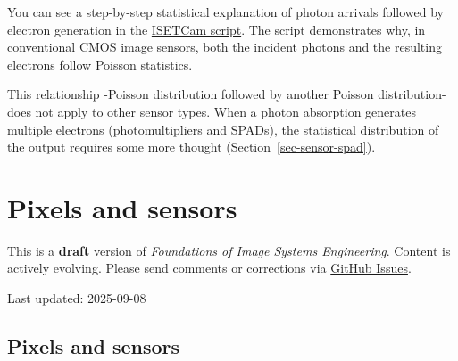 \documentclass[
  letterpaper,
]{book}
\begin{document}
\begin{tcolorbox}[enhanced jigsaw, colframe=quarto-callout-note-color-frame, titlerule=0mm, rightrule=.15mm, opacitybacktitle=0.6, colback=white, leftrule=.75mm, coltitle=black, title=\textcolor{quarto-callout-note-color}{\faInfo}\hspace{0.5em}{ISETCam: shot noise}, bottomrule=.15mm, colbacktitle=quarto-callout-note-color!10!white, breakable, left=2mm, bottomtitle=1mm, toptitle=1mm, opacityback=0, arc=.35mm, toprule=.15mm]

You can see a step-by-step statistical explanation of photon arrivals
followed by electron generation in the
\href{../code/fise_photonsElectrons.html}{ISETCam script}. The script
demonstrates why, in conventional CMOS image sensors, both the incident
photons and the resulting electrons follow Poisson statistics.

This relationship -Poisson distribution followed by another Poisson
distribution- does not apply to other sensor types. When a photon
absorption generates multiple electrons (photomultipliers and SPADs),
the statistical distribution of the output requires some more thought
(Section~\ref{sec-sensor-spad}).

\end{tcolorbox}

\chapter{Pixels and sensors}\label{sec-pixels}

\begin{tcolorbox}[enhanced jigsaw, colframe=quarto-callout-warning-color-frame, titlerule=0mm, rightrule=.15mm, opacitybacktitle=0.6, colback=white, leftrule=.75mm, coltitle=black, title=\textcolor{quarto-callout-warning-color}{\faExclamationTriangle}\hspace{0.5em}{Work in Progress}, bottomrule=.15mm, colbacktitle=quarto-callout-warning-color!10!white, breakable, left=2mm, bottomtitle=1mm, toptitle=1mm, opacityback=0, arc=.35mm, toprule=.15mm]

This is a \textbf{draft} version of \emph{Foundations of Image Systems
Engineering}. Content is actively evolving. Please send comments or
corrections via \href{https://github.com/wandell/FISE-git/issues}{GitHub
Issues}.

Last updated: 2025-09-08

\end{tcolorbox}

\section{Pixels and sensors}\label{sec-pixels-overview}
\end{document}
